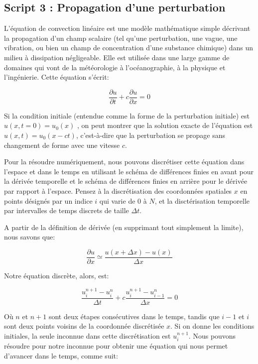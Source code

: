 \documentclass{article}
\begin{document}
    \subsection{Script 3 : Propagation d'une
perturbation}\label{script-3-propagation-dune-perturbation}

    L'équation de convection linéaire est une modèle mathématique simple
décrivant la propagation d'un champ scalaire (tel qu'une perturbation,
une vague, une vibration, ou bien un champ de concentration d'une
substance chimique) dans un milieu à dissipation négligeable. Elle est
utilisée dans une large gamme de domaines qui vont de la météorologie à
l'océanographie, à la physique et l'ingénierie. Cette équation s'écrit:

\[ \frac{\partial u}{\partial t} + c \frac{ \partial u}{\partial x} = 0\]

Si la condition initiale (entendue comme la forme de la perturbation
initiale) est \(u(x, t=0) = u_0 (x)\) , on peut montrer que la solution
exacte de l'équation est \(u (x, t) = u_0 (x-ct)\), c'est-à-dire que la
perturbation se propage sans changement de forme avec une vitesse \(c\).

Pour la résoudre numériquement, nous pouvons discrétiser cette équation
dans l'espace et dans le temps en utilisant le schéma de différences
finies en avant pour la dérivée temporelle et le schéma de différences
finies en arrière pour le dérivée par rapport à l'espace. Pensez à la
discrétisation des coordonnées spatiales \(x\) en points désignés par un
indice \(i\) qui varie de \(0\) à \(N\), et la disctérisation temporelle
par intervalles de temps discrets de taille \(\Delta t\).

A partir de la définition de dérivée (en supprimant tout simplement la
limite), nous savons que:

\[\frac{\partial u}{\partial x} \simeq \frac{u(x+\Delta x) - u(x)}{\Delta x} \]

Notre équation discrète, alors, est:

\[\frac{u_i^{n+1} - u_i^{n}}{\Delta t} + c \frac{u_i^{n+1} - u_{i-1}^{n}}{\Delta x} = 0\]

Où \(n\) et \(n + 1\) sont deux étapes consécutives dans le temps,
tandis que \(i-1\) et \(i\) sont deux points voisins de la coordonnée
discrétisée \(x\). Si on donne les conditions initiales, la seule
inconnue dans cette discrétisation est \(u_i^{n+1}\). Nous pouvons
résoudre pour notre inconnue pour obtenir une équation qui nous permet
d'avancer dans le temps, comme suit:
\end{document}
